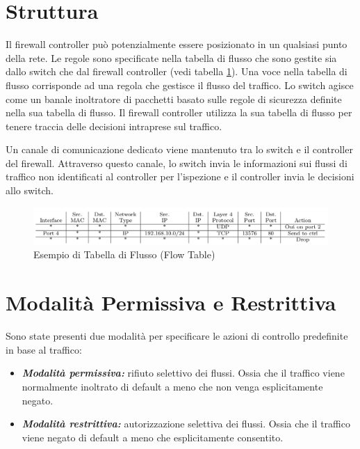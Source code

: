 \onehalfspacing

\section{Struttura}


Il firewall controller può potenzialmente essere posizionato in un qualsiasi punto della rete. Le regole sono specificate nella tabella di flusso che sono gestite sia dallo switch che dal firewall controller (vedi tabella \ref{fig:flow}). Una voce nella tabella di flusso corrisponde ad una regola che gestisce il flusso del traffico. Lo switch agisce come un banale inoltratore di pacchetti basato sulle regole di sicurezza definite nella sua tabella di flusso. Il firewall controller utilizza la sua tabella di flusso per tenere traccia delle decisioni intraprese sul traffico.

Un canale di comunicazione dedicato viene mantenuto tra lo switch e il controller del firewall. Attraverso questo canale, lo switch invia le informazioni sui flussi di traffico non identificati al controller per l'ispezione e il controller invia le decisioni allo switch.

\begin{figure}[H]
  \centering
    \includegraphics[width=\linewidth]{img/flow.png}
    \caption{Esempio di Tabella di Flusso (Flow Table)}
  \label{fig:flow}
\end{figure}

\section{Modalità Permissiva e Restrittiva}

Sono state presenti due modalità per specificare le azioni di controllo predefinite in base al traffico:

\begin{itemize}
  \item \textbf{\textit{Modalità permissiva:}} rifiuto selettivo dei flussi. Ossia che il traffico viene normalmente inoltrato di default a meno che non venga esplicitamente negato.
  \item \textbf{\textit{Modalità restrittiva:}} autorizzazione selettiva dei flussi. Ossia che il traffico viene negato di default a meno che esplicitamente consentito.
\end{itemize}


